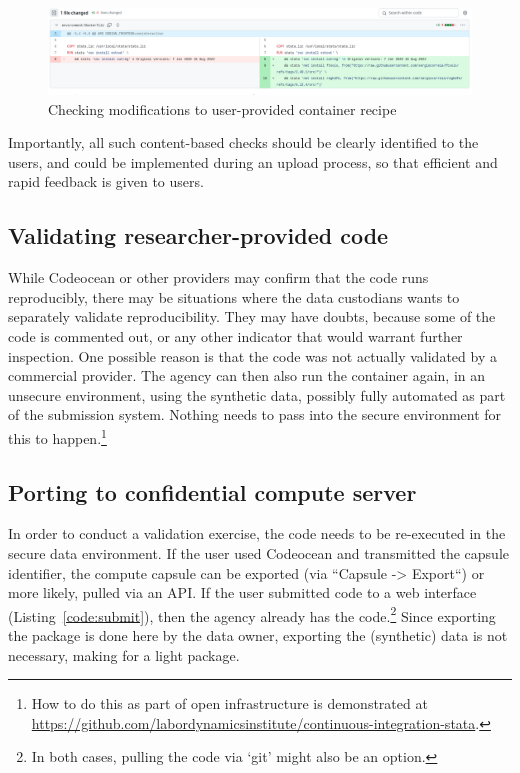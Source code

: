 \documentclass[]{hdsr}
\begin{document}
\begin{figure}[hbt]
    \centering
    \includegraphics[width=1\linewidth]{figs/diff-wide-dockerfile.png}
    \caption{Checking modifications to user-provided container recipe}
    \label{fig:docker-diff}
\end{figure}

Importantly, all such content-based checks should be clearly identified to the users, and could be  implemented during an upload process, so that efficient and rapid feedback is given to users. 

\subsection{Validating researcher-provided code}

While Codeocean or other providers may confirm that the code runs reproducibly, there may be situations where the data custodians wants to separately validate reproducibility. They may have doubts, because some of the code is commented out, or any other indicator that would warrant further inspection. One possible reason is that the code was not actually validated by a commercial provider. The agency  can then also run the container again, in an unsecure environment, using the synthetic data, possibly fully automated as part of the submission system. Nothing needs to pass into the secure environment for this to happen.\footnote{How to do this as part of open infrastructure is demonstrated at \url{https://github.com/labordynamicsinstitute/continuous-integration-stata}.} 





\subsection{Porting to confidential compute server}

In order to conduct a validation exercise, the code needs to be re-executed in the secure data environment. If the user used Codeocean and transmitted the capsule identifier, the compute capsule can be exported (via ``Capsule -> Export``) or more likely, pulled via an API. If the user submitted code to a web interface (Listing~\ref{code:submit}), then the agency already has the code.\footnote{In both cases, pulling the code via `git' might also be an option.} Since exporting the package is done here by the data owner, exporting the (synthetic) data is not necessary, making for a light package. 
\end{document}
